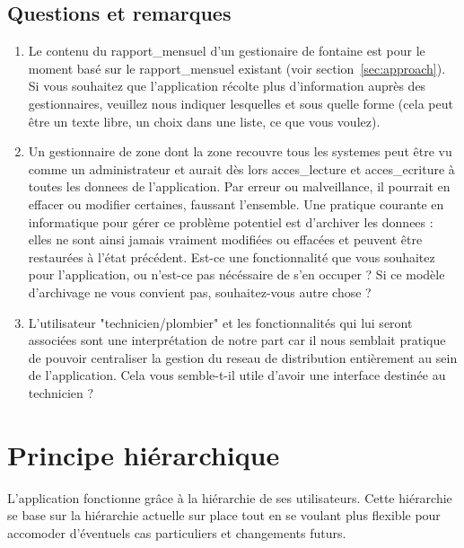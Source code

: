 \documentclass[a4paper, 11pt]{article}
\begin{document}
  \begin{mdframed}[style=HighlightQuestion]
    \subsection{Questions et remarques}
    \begin{enumerate}
      \item Le contenu du \gls{rapport_mensuel} d'un gestionaire de \gls{fontaine} est pour le moment basé sur le \gls{rapport_mensuel} existant (voir section~\ref{sec:approach}). Si vous souhaitez que l'\gls{application} récolte plus d'information auprès des gestionnaires, veuillez nous indiquer lesquelles et sous quelle forme (cela peut être un texte libre, un choix dans une liste, ce que vous voulez).
      \item Un gestionnaire de \gls{zone} dont la \gls{zone} recouvre tous les \gls{systeme}s peut être vu comme un administrateur et aurait dès lors \gls{acces_lecture} et \gls{acces_ecriture} à toutes les \glspl{donnee} de l'\gls{application}. Par erreur ou malveillance, il pourrait en effacer ou modifier certaines, faussant l'ensemble. Une pratique courante en informatique pour gérer ce problème potentiel est d'archiver les \glspl{donnee} : elles ne sont ainsi jamais vraiment modifiées ou effacées et peuvent être restaurées à l'état précédent. Est-ce une fonctionnalité que vous souhaitez pour l'\gls{application}, ou n'est-ce pas nécéssaire de s'en occuper ? Si ce modèle d'archivage ne vous convient pas, souhaitez-vous autre chose ?
      \item L'\gls{utilisateur} "technicien/plombier" et les fonctionnalités qui lui seront associées sont une interprétation de notre part car il nous semblait pratique de pouvoir centraliser la gestion du \gls{reseau} de distribution entièrement au sein de l'\gls{application}. Cela vous semble-t-il utile d'avoir une \gls{interface} destinée au technicien ?
    \end{enumerate}
  \end{mdframed}

  \section{Principe hiérarchique}
    L'\gls{application} fonctionne grâce à la hiérarchie de ses \glspl{utilisateur}. Cette hiérarchie se base sur la hiérarchie actuelle sur place tout en se voulant plus flexible pour accomoder d'éventuels cas particuliers et changements futurs.
\end{document}
